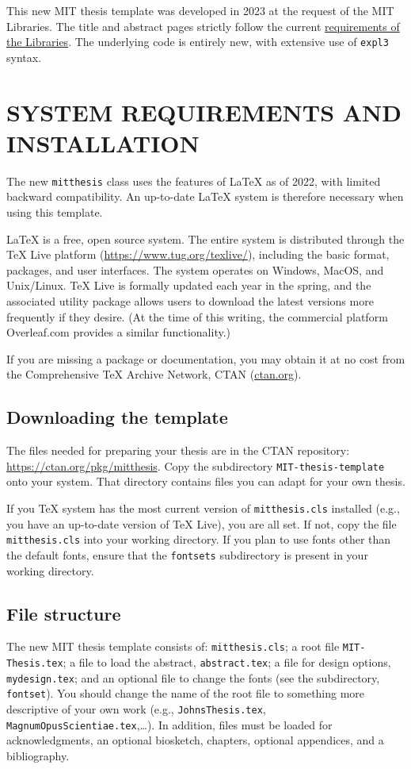 \documentclass[11pt]{article}
\begin{document}
This new MIT thesis template was developed in 2023 at the request of the MIT Libraries.  The title and abstract pages strictly follow the current \href{https://libraries.mit.edu/distinctive-collections/thesis-specs/}{requirements of the Libraries}. The underlying code is entirely new, with extensive use of \texttt{expl3} syntax.

\section{SYSTEM REQUIREMENTS AND INSTALLATION}\label{sec:2}
The new \texttt{mitthesis} class uses the features of \LaTeX{} as of 2022, with limited backward compatibility. An up-to-date \LaTeX{} system is therefore necessary when using this template.  

\LaTeX{} is a free, open source system. The entire system is distributed through the \TeX{} Live platform (\url{https://www.tug.org/texlive/}), including the basic format, packages, and user interfaces.  The system operates on Windows, MacOS, and Unix/Linux. \TeX{} Live is formally updated each year in the spring, and the associated utility package allows users to download the latest versions more frequently if they desire. (At the time of this writing, the commercial platform Overleaf.com provides a similar functionality.)

If you are missing a package or documentation, you may obtain it at no cost from the Comprehensive \TeX{} Archive Network, CTAN (\href{http://ctan.org}{ctan.org}). 

\subsection{Downloading the template}
The files needed for preparing your thesis are in the CTAN repository: \url{https://ctan.org/pkg/mitthesis}. Copy the subdirectory \texttt{MIT-thesis-template} onto your system. That directory contains files you can adapt for your own thesis. 

If you \TeX{} system has the most current version of \texttt{mitthesis.cls} installed (e.g., you have an up-to-date version of \TeX{} Live), you are all set.  If not, copy the file \texttt{mitthesis.cls} into your working directory. If you plan to use fonts other than the default fonts, ensure that the \texttt{fontsets} subdirectory is present in your working directory.

\subsection{File structure}
The new MIT thesis template consists of: \texttt{mitthesis.cls}; a root file \texttt{MIT-Thesis.tex}; a file to load the abstract, \texttt{abstract.tex}; a file for design options, \texttt{mydesign.tex}; and an optional file to change the fonts (see the subdirectory, \texttt{fontset}). You should change the name of the root file to something more descriptive of your own work (e.g., \texttt{JohnsThesis.tex}, \texttt{MagnumOpusScientiae.tex},\ldots). In addition, files must be loaded for acknowledgments, an optional biosketch, chapters, optional appendices, and a bibliography.
\end{document}
